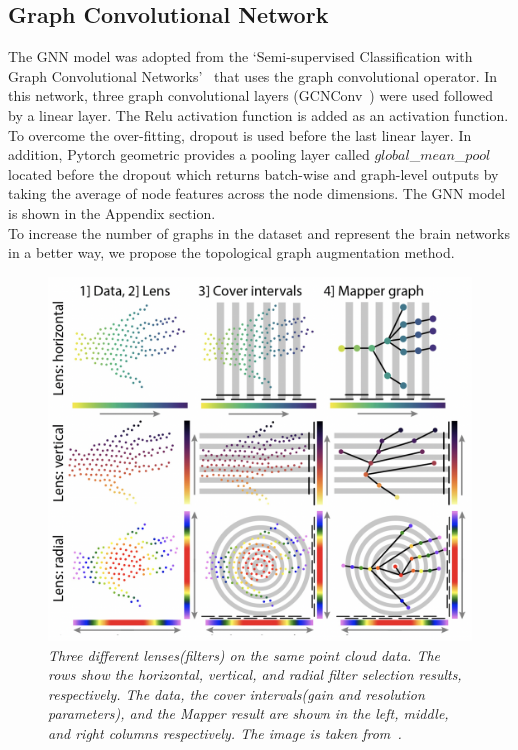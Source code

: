 \documentclass[runningheads]{llncs}
\begin{document}
  \subsection{Graph Convolutional Network}
The GNN model was adopted from the `Semi-supervised Classification with Graph Convolutional Networks'~\cite{kipf2016} that uses the graph convolutional operator. In this network, three graph convolutional layers (GCNConv~\cite{GCNConv}) were used followed by a linear layer. The Relu activation function is added as an activation function. To overcome the over-fitting, dropout is used before the last linear layer. In addition, Pytorch geometric provides a pooling layer called $global$\_$mean$\_$pool$ located before the dropout which returns batch-wise and graph-level outputs by taking the average of node features across the node dimensions\cite{Poolinglayers}. The GNN model is shown in the Appendix section.\\
To increase the number of graphs in the dataset and represent the brain networks in a better way, we propose the topological graph augmentation method.

%
\begin{figure}[!ht]
  \centering
  \includegraphics[width=12cm]{images/different_filters.png}
  \caption{\textit{Three different lenses(filters) on the same point cloud data. The rows show the horizontal, vertical, and radial filter selection results, respectively. The data, the cover intervals(gain and resolution parameters), and the Mapper result are shown in the left, middle, and right columns respectively. The image is taken from~\cite{chazal2021introduction}.}}
  \label{different_filters}
\end{figure}
%
\end{document}
